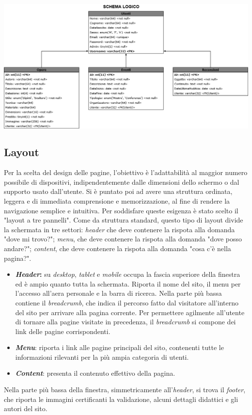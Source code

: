 \begin{center}
	\includegraphics[width=\textwidth]{img/SchemaLogico}
\end{center}

\subsection{Layout}
\label{progettazione-layout}
Per la scelta del design delle pagine, l'obiettivo è l'adattabilità al maggior numero possibile di dispositivi, indipendentemente dalle dimensioni dello schermo o dal supporto usato dall'utente. Si è puntato poi ad avere una struttura ordinata, leggera e di immediata comprensione e memorizzazione, al fine di rendere la navigazione semplice e intuitiva.
Per soddisfare queste esigenza è stato scelto il "layout a tre pannelli". Come da struttura standard, questo tipo di layout divide la schermata in tre settori: \textit{header} che deve contenere la rispota alla domanda "dove mi trovo?"; \textit{menu}, che deve contenere la rispota alla domanda "dove posso andare?"; \textit{content}, che deve contenere la rispota alla domanda "cosa c'è nella pagina?".
\begin{itemize}
	\item \textbf{\textit{Header}:} su \textit{desktop}, \textit{tablet} e \textit{mobile} occupa la fascia superiore della finestra ed è ampio quanto tutta la schermata. Riporta il nome del sito, il menu per l'accesso all'aera personale e la barra di ricerca. Nella parte più bassa contiene il \textit{breadcrumb}, che indica il percorso fatto dal visitatore all'interno del sito per arrivare alla pagina corrente. Per permettere agilmente all'utente di tornare alla pagine visitate in precedenza, il \textit{breadcrumb} si compone dei link delle pagine corrispondenti. 
	\item \textbf{\textit{Menu}}: riporta i link alle pagine principali del sito, contenenti tutte le informazioni rilevanti per la più ampia categoria di utenti.
	\item \textbf{\textit{Content}}: presenta il contenuto effettivo della pagina.
\end{itemize}
Nella parte più bassa della finestra, simmetricamente all'\textit{header}, si trova il \textit{footer}, che riporta le immagini certificanti la validazione, alcuni dettagli didattici e gli autori del sito. \\\\

